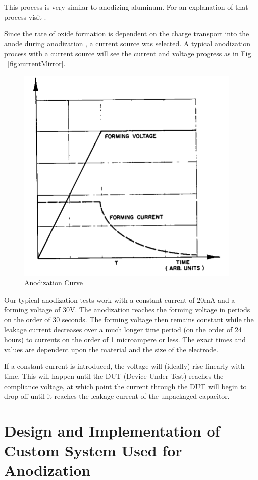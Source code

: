 \documentclass[journal]{IEEEtran}
\begin{document}
This process is very similar to anodizing aluminum. For an explanation of that process visit \cite{cwruEncAlanod}.

Since the rate of oxide formation is dependent on the charge transport into the anode during anodization \cite{tiMinit}, a current source was selected. A typical anodization process with a current source will see the current and voltage progress as in Fig. ~\ref{fig:currentMirror}.


\begin{figure}[here]
\centering
\includegraphics{anodCurve}
\caption{Anodization Curve \cite{tiMinit}}
\label{fig:anodCurve}
\end{figure}

Our typical anodization tests work with a constant current of 20mA and a forming voltage of 30V. The anodization reaches the forming voltage in periods on the order of 30 seconds. The forming voltage then remains constant while the leakage current decreases over  a much longer time period (on the order of 24 hours) to currents on the order of 1 microampere or less. The exact times and values are dependent upon the material and the size of the electrode.

If a constant current is introduced, the voltage will (ideally) rise linearly with time. This will happen until the DUT (Device Under Test) reaches the compliance voltage, at which point the current through the DUT will begin to drop off until it reaches the leakage current of the unpackaged capacitor. 

\section{Design and Implementation of Custom System Used for Anodization}
\end{document}
